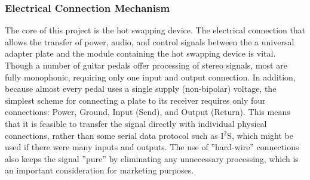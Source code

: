 		\subsubsection{Electrical Connection Mechanism}

		The core of this project is the hot swapping device.  The electrical connection that allows the transfer of power, audio, and control signals between the a universal adapter plate and the module containing the hot swapping device is vital.  Though a number of guitar pedals offer processing of stereo signals, most are fully monophonic, requiring only one input and output connection.  In addition, because almost every pedal uses a single supply (non-bipolar) voltage, the simplest scheme for connecting a plate to its receiver requires only four connections: Power, Ground, Input (Send), and Output (Return). This means that it is feasible to transfer the signal directly with individual physical connections, rather than some serial data protocol such as I$^2$S, which might be used if there were many inputs and outputs.  The use of ”hard-wire” connections also keeps the signal ”pure” by eliminating any unnecessary processing, which is an important consideration for marketing purposes.  

